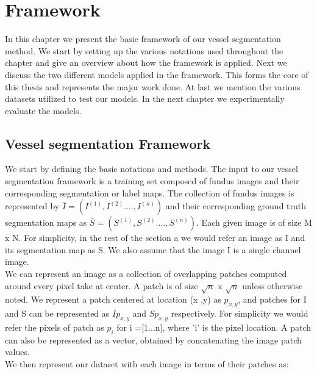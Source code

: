 \chapter{Framework}

\ifpdf
\graphicspath{{Chapter3/Figs/Raster/}{Chapter3/Figs/PDF/}{Chapter3/Figs/}}
\else
\graphicspath{{Chapter3/Figs/Vector/}{Chapter3/Figs/}}
\fi
In this chapter we present the basic framework of our vessel segmentation method. We start by setting up the various notations used throughout the chapter and give an overview about how the framework is applied. Next we discuss the two different models applied in the framework. This forms the core of this thesis and represents the major work done. At last we mention the various datasets utilized to test our models. In the next chapter we experimentally evaluate the models.\\
\section{Vessel segmentation Framework}
We start by defining the basic notations and methods. The input to our vessel segmentation framework is a training set composed of fundus images and their corresponding segmentation or label maps. The collection of fundus images is represented by $\bar{I} = (I^{(1)},I^{(2)}...., I^{(n)} )$  and their corresponding ground truth segmentation maps as $\bar{S} = (S^{(1)},S^{(2)}...., S^{(n)} )$. Each given image is of size M x N.
For simplicity, in the rest of the section a we would refer an image as I and its segmentation map as S. We also assume that the image I is a single channel image.\\

We can represent an image as a collection of overlapping patches computed around every pixel take at center. A patch is of size $\sqrt{n}$ x $\sqrt{n}$ unless otherwise noted. We represent a patch centered at location (x ,y) as $p_{x,y}$, and patches for I and S can be represented as $Ip_{x,y}$ and $Sp_{x,y}$ respectively. For simplicity we would refer the pixels of patch as ${p}_i$ for i =[1...n], where 'i' is the pixel location. A patch can also be represented as a vector, obtained by concatenating the image patch values.\\

We then represent our dataset with each image in terms of their patches as:


